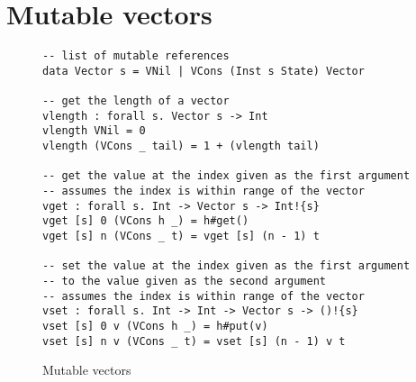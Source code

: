 \section{Mutable vectors}
\begin{figure}[h]
\caption{Mutable vectors}
\begin{verbatim}
-- list of mutable references
data Vector s = VNil | VCons (Inst s State) Vector

-- get the length of a vector
vlength : forall s. Vector s -> Int
vlength VNil = 0
vlength (VCons _ tail) = 1 + (vlength tail)

-- get the value at the index given as the first argument
-- assumes the index is within range of the vector
vget : forall s. Int -> Vector s -> Int!{s}
vget [s] 0 (VCons h _) = h#get()
vget [s] n (VCons _ t) = vget [s] (n - 1) t

-- set the value at the index given as the first argument
-- to the value given as the second argument
-- assumes the index is within range of the vector
vset : forall s. Int -> Int -> Vector s -> ()!{s}
vset [s] 0 v (VCons h _) = h#put(v)
vset [s] n v (VCons _ t) = vset [s] (n - 1) v t
\end{verbatim}
\label{fig:vectors}
\end{figure}

